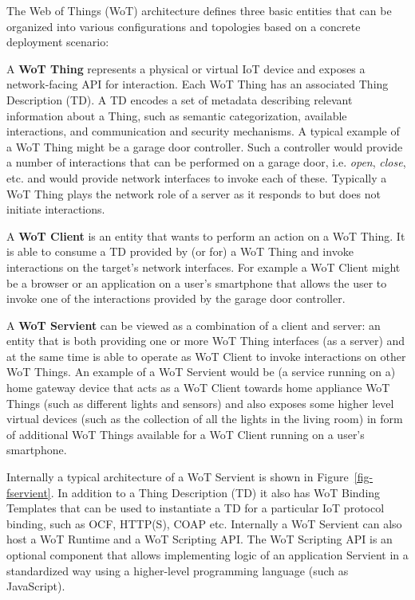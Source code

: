 The Web of Things (WoT) architecture\cite{Wot2017arch} defines three basic entities
that can be organized into various configurations and topologies 
based on a concrete deployment scenario:

A \textbf{WoT Thing} represents a physical or virtual IoT device 
        and exposes a network-facing API for interaction.
	Each WoT Thing has an associated Thing Description (TD)\cite{Wot2017td}. 
        A TD encodes a set of metadata describing relevant information about a Thing,
        such as semantic categorization, available interactions, and communication and security mechanisms.
	A typical example of a WoT Thing might be a garage door controller.
        Such a controller would provide a number of interactions that can be performed on a garage door, 
        i.e. \textit{open}, \textit{close}, etc. and would provide network interfaces to invoke
        each of these.
        Typically a WoT Thing plays the network role of a server as it responds to
        but does not initiate interactions.


A \textbf{WoT Client} is an entity that wants to perform an action on a WoT Thing.
	It is able to consume a TD provided by (or for) a WoT Thing and invoke interactions on 
        the target's network interfaces.
	For example a WoT Client might be a browser or an application on a user's smartphone
        that allows the user to invoke one of the interactions provided by the garage door controller. 


A \textbf{WoT Servient} can be viewed as a combination of a client and server:
        an entity that is both providing one or more WoT Thing interfaces (as a server) and
        at the same time is able to operate as WoT Client to invoke interactions on other WoT Things.
	An example of a WoT Servient would be (a service running on a) home gateway device 
        that acts as a WoT Client towards home appliance WoT Things
        (such as different lights and sensors) and also exposes some higher level
        virtual devices (such as the collection of all the lights in the living room)
        in form of additional WoT Things available for a WoT Client running on a user's smartphone.

Internally a typical architecture of a WoT Servient is shown in Figure~\ref{fig-fservient}. 
In addition to a Thing Description (TD) it also has WoT Binding Templates 
that can be used to instantiate a TD for a particular IoT protocol binding, 
such as OCF, HTTP(S), COAP etc. 
Internally a WoT Servient can also host a WoT Runtime and
a WoT Scripting API.
The WoT Scripting API is an optional component that allows 
implementing logic of an application Servient in a standardized way
using a higher-level programming language (such as JavaScript). 

